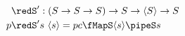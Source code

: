 \documentclass[preview]{standalone}
\begin{document}
\begin{align*}%
    \redS' &: (S \rightarrow S \rightarrow S) \rightarrow S \rightarrow \vect{S} \rightarrow S\\
    p \redS' & s\ \vect{s} =%
                pc \fMapS \vect{s} \pipeS s%
\end{align*}
\end{document}
